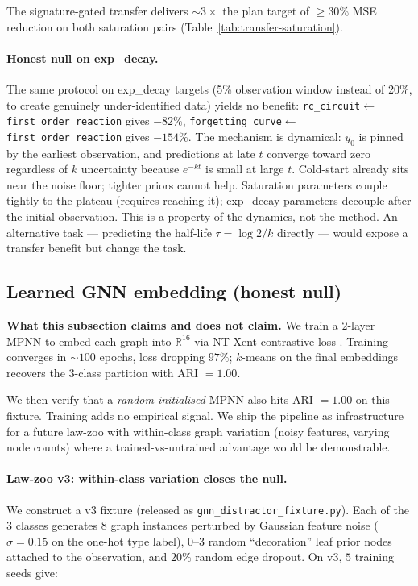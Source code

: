 \documentclass{article}
\begin{document}
The signature-gated transfer delivers $\sim 3 \times$ the plan
target of $\geq 30\%$ MSE reduction on both saturation pairs
(Table~\ref{tab:transfer-saturation}).

\paragraph{Honest null on exp\_decay.}
The same protocol on exp\_decay targets (5\% observation window
instead of 20\%, to create genuinely under-identified data) yields
no benefit: \texttt{rc\_circuit}$\leftarrow$\texttt{first\_order\_reaction}
gives $-82\%$, \texttt{forgetting\_curve}$\leftarrow$\texttt{first\_order\_reaction}
gives $-154\%$. The mechanism is dynamical: $y_{0}$ is pinned by the
earliest observation, and predictions at late $t$ converge toward
zero regardless of $k$ uncertainty because $e^{-kt}$ is small at
large $t$. Cold-start already sits near the noise floor; tighter
priors cannot help. Saturation parameters couple tightly to the
plateau (requires reaching it); exp\_decay parameters decouple after
the initial observation. This is a property of the dynamics, not
the method. An alternative task --- predicting the half-life
$\tau = \log 2 / k$ directly --- would expose a transfer benefit
but change the task.

\subsection{Learned GNN embedding (honest null)}
\label{sec:gnn}

\textbf{What this subsection claims and does not claim.} We train a
$2$-layer MPNN \citep{gilmer2017mpnn} to embed each graph into
$\mathbb{R}^{16}$ via NT-Xent contrastive loss \citep{chen2020simclr}.
Training converges in $\sim 100$ epochs, loss dropping $97\%$; $k$-means
on the final embeddings recovers the $3$-class partition with
ARI $= 1.00$.

We then verify that a \emph{random-initialised} MPNN also hits
ARI $= 1.00$ on this fixture. Training adds no empirical signal.
We ship the pipeline as infrastructure for a future law-zoo with
within-class graph variation (noisy features, varying node counts)
where a trained-vs-untrained advantage would be demonstrable.

\paragraph{Law-zoo v3: within-class variation closes the null.}
We construct a v3 fixture (released as
\texttt{gnn\_distractor\_fixture.py}). Each of the $3$ classes
generates $8$ graph instances perturbed by Gaussian feature noise
($\sigma = 0.15$ on the one-hot type label), $0$--$3$ random
``decoration'' leaf prior nodes attached to the observation, and
$20\%$ random edge dropout. On v3, $5$ training seeds give:
\end{document}
